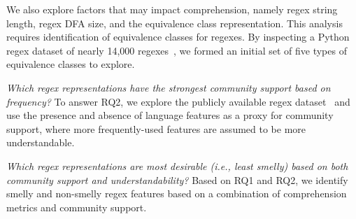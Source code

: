 We also explore factors that may impact comprehension, namely regex string length, regex DFA size, and the equivalence class representation.
This analysis requires identification of equivalence classes for regexes. By inspecting a Python regex dataset of nearly 14,000 regexes~\cite{chapman2016}, we formed an initial set of five types of equivalence classes to explore.

 {\em Which regex representations have the strongest {community support} based on frequency?} %
To answer RQ2, we explore the publicly available regex dataset~\cite{chapman2016} and use the presence and absence of language features as a proxy for community support, where more frequently-used features are assumed to be more understandable.

 {\em Which regex representations are most desirable (i.e., least smelly) based on both community support and understandability?}
Based on RQ1 and RQ2, we identify smelly and non-smelly regex features based on a combination of comprehension metrics and community support.


%
%
%
%
%
%
%




